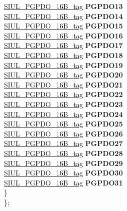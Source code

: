 \begin{DoxyCompactItemize}
\begin{tabbing}
\>\>\mbox{\hyperlink{unionSIUL__PGPDO__16B__tag}{SIUL\_PGPDO\_16B\_tag}} {\bfseries PGPDO13}\\
\>\>\mbox{\hyperlink{unionSIUL__PGPDO__16B__tag}{SIUL\_PGPDO\_16B\_tag}} {\bfseries PGPDO14}\\
\>\>\mbox{\hyperlink{unionSIUL__PGPDO__16B__tag}{SIUL\_PGPDO\_16B\_tag}} {\bfseries PGPDO15}\\
\>\>\mbox{\hyperlink{unionSIUL__PGPDO__16B__tag}{SIUL\_PGPDO\_16B\_tag}} {\bfseries PGPDO16}\\
\>\>\mbox{\hyperlink{unionSIUL__PGPDO__16B__tag}{SIUL\_PGPDO\_16B\_tag}} {\bfseries PGPDO17}\\
\>\>\mbox{\hyperlink{unionSIUL__PGPDO__16B__tag}{SIUL\_PGPDO\_16B\_tag}} {\bfseries PGPDO18}\\
\>\>\mbox{\hyperlink{unionSIUL__PGPDO__16B__tag}{SIUL\_PGPDO\_16B\_tag}} {\bfseries PGPDO19}\\
\>\>\mbox{\hyperlink{unionSIUL__PGPDO__16B__tag}{SIUL\_PGPDO\_16B\_tag}} {\bfseries PGPDO20}\\
\>\>\mbox{\hyperlink{unionSIUL__PGPDO__16B__tag}{SIUL\_PGPDO\_16B\_tag}} {\bfseries PGPDO21}\\
\>\>\mbox{\hyperlink{unionSIUL__PGPDO__16B__tag}{SIUL\_PGPDO\_16B\_tag}} {\bfseries PGPDO22}\\
\>\>\mbox{\hyperlink{unionSIUL__PGPDO__16B__tag}{SIUL\_PGPDO\_16B\_tag}} {\bfseries PGPDO23}\\
\>\>\mbox{\hyperlink{unionSIUL__PGPDO__16B__tag}{SIUL\_PGPDO\_16B\_tag}} {\bfseries PGPDO24}\\
\>\>\mbox{\hyperlink{unionSIUL__PGPDO__16B__tag}{SIUL\_PGPDO\_16B\_tag}} {\bfseries PGPDO25}\\
\>\>\mbox{\hyperlink{unionSIUL__PGPDO__16B__tag}{SIUL\_PGPDO\_16B\_tag}} {\bfseries PGPDO26}\\
\>\>\mbox{\hyperlink{unionSIUL__PGPDO__16B__tag}{SIUL\_PGPDO\_16B\_tag}} {\bfseries PGPDO27}\\
\>\>\mbox{\hyperlink{unionSIUL__PGPDO__16B__tag}{SIUL\_PGPDO\_16B\_tag}} {\bfseries PGPDO28}\\
\>\>\mbox{\hyperlink{unionSIUL__PGPDO__16B__tag}{SIUL\_PGPDO\_16B\_tag}} {\bfseries PGPDO29}\\
\>\>\mbox{\hyperlink{unionSIUL__PGPDO__16B__tag}{SIUL\_PGPDO\_16B\_tag}} {\bfseries PGPDO30}\\
\>\>\mbox{\hyperlink{unionSIUL__PGPDO__16B__tag}{SIUL\_PGPDO\_16B\_tag}} {\bfseries PGPDO31}\\
\>\} \\
\}; \\


\end{tabbing}
\end{DoxyCompactItemize}
